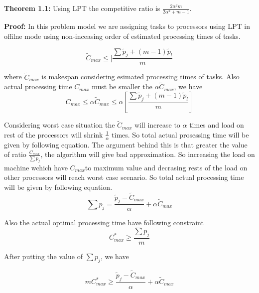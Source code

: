 \documentclass[10pt, conference, compsocconf]{IEEEtran}
\begin{document}
\textbf{Theorem 1.1:} Using LPT the competitive ratio is $ \frac{2\alpha^{2}m}{2\alpha^{2}+ m-1}$.

\textbf{Proof:} In this problem model we are assigning tasks to processors using LPT in offilne mode using non-inceasing order of estimated processing times of tasks.

 


 
\begin{equation}
\tilde C_{max}\leq  [\frac{\sum{\tilde p_j + (m-1) \tilde p_l} }{m}
\end{equation}

where $\tilde C_{max}$ is makespan considering esimated processing  times  of tasks.  Also actual processing time  $C_{max}$ must be smaller the $\alpha\tilde C_{max}$, we have \\

\begin{equation}
 C_{max}\leq \alpha \tilde C_{max}\leq \alpha [\frac{\sum{\tilde p_j + (m-1) \tilde p_l} }{m}] 
\end{equation} 

Considering worst case situation the $\tilde C_{max}$ will increase to $\alpha$ times and load on rest of the processors will shrink  $\frac{1}{\alpha}$ times. So total actual prosessing time will be given by following equation.  The argument behind this is that greater the value of ratio $\frac{C_{max}}{\sum{p_j}}$, the algorithm will give bad approximation. So increasing the load on machine wchich have $C_{max} $to maximum
value and decrasing rests of the load on other processors will reach worst case scenario. So total actual processing time will be given by following equation.
 \begin{equation}
 \sum {p_j} = \frac{\tilde p_j- \tilde C_{max}}{\alpha} + \alpha \tilde C_{max}
 \end{equation}
 
 Also the actual optimal processing time have following constraint
 \begin{equation}\nonumber 
C_{max}^{*}\geq \frac{\sum {p_j}}{m}
\end{equation}

After putting the value of  $ \sum {p_j}$, we have

 \begin{equation}\nonumber 
 m C_{max}^{*}\geq \frac{\tilde p_j- \tilde C_{max}}{\alpha} + \alpha \tilde C_{max}
 \end{equation}
 
\end{document}
